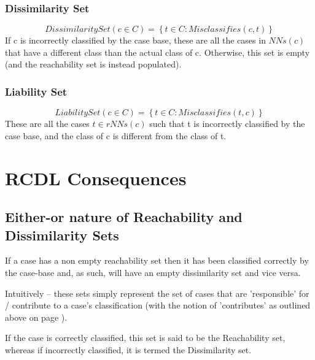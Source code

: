 \documentclass[a4paper,11pt]{report}
\begin{document}
\subsubsection{Dissimilarity Set}
\[ DissimilaritySet(c \in C) = \left\lbrace t \in C : Misclassifies(c, t) \right\rbrace \]  
If c is incorrectly classified by the case base, these are all the cases in $ NNs(c) $ that have a different class than the actual class of c. Otherwise, this set is empty (and the reachability set is instead populated).

\subsubsection{Liability Set}
\[ LiabilitySet(c \in C) = \left\lbrace t \in C : Misclassifies(t, c) \right\rbrace \]  
These are all the cases $ t \in rNNs(c) $ such that t is incorrectly classified by the case base, and the class of c is different from the class of t.

\section{RCDL Consequences}

\subsection{Either-or nature of Reachability and Dissimilarity Sets}
If a case has a non empty reachability set then it has been classified correctly by the case-base and, as such, will have an empty dissimilarity set and vice versa.

Intuitively – these sets simply represent the set of cases that are 'responsible' for / contribute to a case's classification (with the notion of 'contributes' as outlined above on page \pageref{sec:contributes}). 

If the case is correctly classified, this set is said to be the Reachability set, whereas if incorrectly classified, it is termed the Dissimilarity set.
\end{document}
